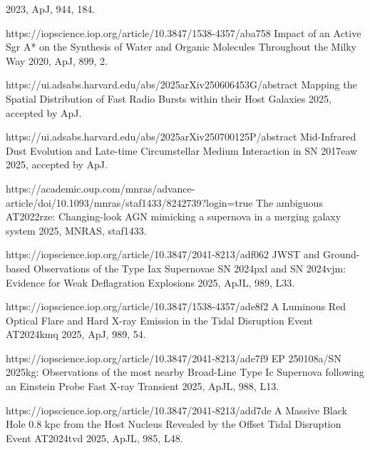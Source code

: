 \begin{cvpubs}
{\begin{cvitems}
    {2023, ApJ, 944, 184.}
    \item {}
    {}
    {https://iopscience.iop.org/article/10.3847/1538-4357/aba758}
    {Impact of an Active Sgr A* on the Synthesis of Water and Organic Molecules Throughout the Milky Way}
    {2020, ApJ, 899, 2.}
    \item {}
    {\Cliu}
    {https://ui.adsabs.harvard.edu/abs/2025arXiv250606453G/abstract}
    {Mapping the Spatial Distribution of Fast Radio Bursts within their Host Galaxies}
    {2025, accepted by ApJ.}
    \item {}
    {\Cliu}
    {https://ui.adsabs.harvard.edu/abs/2025arXiv250700125P/abstract}
    {Mid-Infrared Dust Evolution and Late-time Circumstellar Medium Interaction in SN 2017eaw}
    {2025, accepted by ApJ.}
    \item {}
    {\Cliu}
    {https://academic.oup.com/mnras/advance-article/doi/10.1093/mnras/staf1433/8242739?login=true}
    {The ambiguous AT2022rze: Changing-look AGN mimicking a supernova in a merging galaxy system}
    {2025, MNRAS, staf1433.}
    \item {}
    {\Cliu}
    {https://iopscience.iop.org/article/10.3847/2041-8213/adf062}
    {JWST and Ground-based Observations of the Type Iax Supernovae SN 2024pxl and SN 2024vjm: Evidence for Weak Deflagration Explosions}
    {2025, ApJL, 989, L33.}
\end{cvitems}
}
\cvpub
{
\begin{cvitems}
    \item {}
    {\Cliu}
    {https://iopscience.iop.org/article/10.3847/1538-4357/ade8f2}
    {A Luminous Red Optical Flare and Hard X-ray Emission in the Tidal Disruption Event AT2024kmq}
    {2025, ApJ, 989, 54.}
    \item {}
    {\Cliu}
    {https://iopscience.iop.org/article/10.3847/2041-8213/ade7f9}
    {EP 250108a/SN 2025kg: Observations of the most nearby Broad-Line Type Ic Supernova following an Einstein Probe Fast X-ray Transient}
    {2025, ApJL, 988, L13.}
    \item {}
    {\Cliu}
    {https://iopscience.iop.org/article/10.3847/2041-8213/add7de}
    {A Massive Black Hole 0.8 kpc from the Host Nucleus Revealed by the Offset Tidal Disruption Event AT2024tvd}
    {2025, ApJL, 985, L48.}
    \item {} 

\end{cvitems}}
\end{cvpubs}
